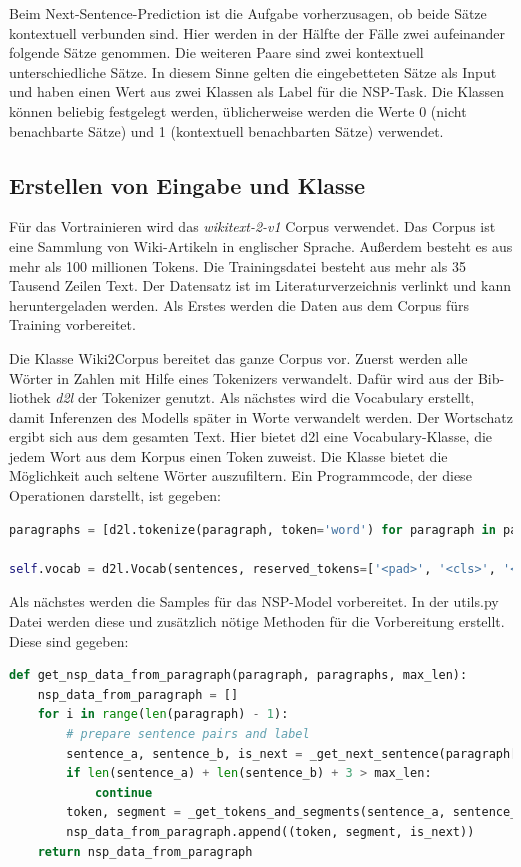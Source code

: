 Beim Next-Sentence-Prediction ist die Aufgabe vorherzusagen, ob beide Sätze kontextuell verbunden sind. Hier werden in der Hälfte der Fälle zwei aufeinander folgende Sätze genommen. Die weiteren Paare sind zwei kontextuell unterschiedliche Sätze. In diesem Sinne gelten die eingebetteten Sätze als Input und haben einen Wert aus zwei Klassen als Label für die NSP-Task. Die Klassen können beliebig festgelegt werden, üblicherweise werden die Werte 0 (nicht benachbarte Sätze) und 1 (kontextuell benachbarten Sätze) verwendet. 

\subsection{Erstellen von Eingabe und Klasse}

Für das Vortrainieren wird das \textit{wikitext-2-v1} \cite{wikitext2:20} Corpus verwendet. Das Corpus ist eine Sammlung von Wiki-Artikeln in englischer Sprache. Außerdem besteht es aus mehr als 100 millionen Tokens. Die Trainingsdatei besteht aus mehr als 35 Tausend Zeilen Text. Der Datensatz ist im Literaturverzeichnis verlinkt und kann heruntergeladen werden. Als Erstes werden die Daten aus dem Corpus fürs Training vorbereitet.

Die Klasse Wiki2Corpus bereitet das ganze Corpus vor. Zuerst werden alle Wörter in Zahlen mit Hilfe eines Tokenizers verwandelt. Dafür wird aus der Bib-liothek \textit{d2l} \cite{d2l:21} der Tokenizer genutzt. Als nächstes wird die Vocabulary erstellt, damit Inferenzen des Modells später in Worte verwandelt werden. Der Wortschatz ergibt sich aus dem gesamten Text. Hier bietet d2l eine Vocabulary-Klasse, die jedem Wort aus dem Korpus einen Token zuweist. Die Klasse bietet die Möglichkeit auch seltene Wörter auszufiltern. Ein Programmcode, der diese Operationen darstellt, ist gegeben:

\begin{lstlisting}[language=Python, caption={Nutzung der Dive into Deep Learning (d2l) Bibliothek}]
paragraphs = [d2l.tokenize(paragraph, token='word') for paragraph in paragraphs]

self.vocab = d2l.Vocab(sentences, reserved_tokens=['<pad>', '<cls>', '<sep>', '<mask>'])
\end{lstlisting}

Als nächstes werden die Samples für das NSP-Model vorbereitet. In der utils.py Datei werden diese und zusätzlich nötige Methoden für die Vorbereitung erstellt. Diese sind gegeben:

\begin{lstlisting}[language=Python, caption={Erstellen der Trainingsdaten für NSP}]	
def get_nsp_data_from_paragraph(paragraph, paragraphs, max_len):
	nsp_data_from_paragraph = []
	for i in range(len(paragraph) - 1):
		# prepare sentence pairs and label
		sentence_a, sentence_b, is_next = _get_next_sentence(paragraph[i], paragraph[i + 1], paragraphs) 
		if len(sentence_a) + len(sentence_b) + 3 > max_len:
			continue
		token, segment = _get_tokens_and_segments(sentence_a, sentence_b) # add keywords
		nsp_data_from_paragraph.append((token, segment, is_next))
	return nsp_data_from_paragraph
\end{lstlisting}


